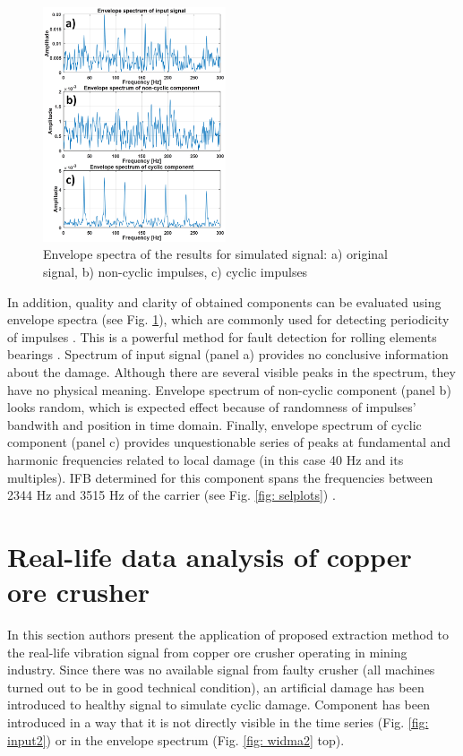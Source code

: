\documentclass[journal]{IEEEtran}
\begin{document}
\begin{figure}[!ht]
\centering
\includegraphics[width = 0.48\textwidth]{figs3/output_specs2.png}
\caption{Envelope spectra of the results for simulated signal: a) original signal, b) non-cyclic impulses, c) cyclic impulses}
\label{fig: outspecs}
\end{figure}



In addition, quality and clarity of obtained components can be evaluated using envelope spectra (see Fig. \ref{fig: outspecs}), which are commonly used for detecting periodicity of impulses \cite{randall2011rolling}. This is a powerful method for fault detection for rolling elements bearings \cite{randall2011rolling}. Spectrum of input signal (panel a) provides no conclusive information about the damage. Although there are several visible peaks in the spectrum, they have no physical meaning. Envelope spectrum of non-cyclic component (panel b) looks random, which is expected effect because of randomness of impulses' bandwith and position in time domain. Finally, envelope spectrum of cyclic component (panel c) provides unquestionable series of peaks at fundamental and harmonic frequencies related to local damage (in this case 40 Hz and its multiples). IFB determined for this component spans the frequencies between 2344 Hz and 3515 Hz of the carrier (see Fig. \ref{fig: selplots}) .



\section{Real-life data analysis of copper ore crusher}

In this section authors present the application of proposed extraction method to the real-life vibration signal from copper ore crusher operating in mining industry. Since there was no available signal from faulty crusher (all machines turned out to be in good technical condition), an artificial damage has been introduced to healthy signal to simulate cyclic damage. Component has been introduced in a way that it is not directly visible in the time series (Fig. \ref{fig: input2}) or in the envelope spectrum (Fig. \ref{fig: widma2} top).
\end{document}
